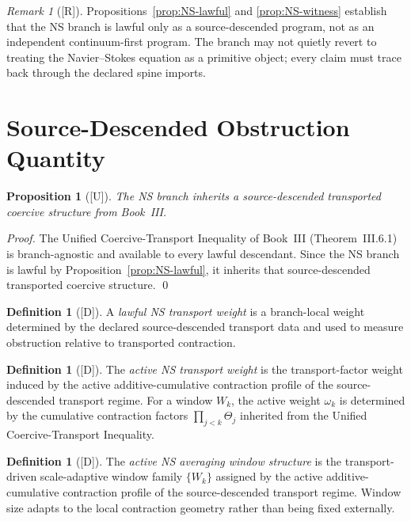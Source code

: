 \documentclass[12pt,oneside]{amsbook}
\theoremstyle{plain}
\newtheorem{proposition}[theorem]{Proposition}
\theoremstyle{definition}
\newtheorem{definition}[theorem]{Definition}
\theoremstyle{remark}
\newtheorem{remark}[theorem]{Remark}
\newcommand{\status}[1]{\textup{[#1]}}
\begin{document}
\begin{remark}[\status{R}]\label{rmk:NS-source-descended}
Propositions~\ref{prop:NS-lawful} and \ref{prop:NS-witness}
establish that the NS branch is lawful only as a
source-descended program, not as an independent
continuum-first program. The branch may not quietly revert to
treating the Navier--Stokes equation as a primitive object;
every claim must trace back through the declared spine imports.
\end{remark}

\section{Source-Descended Obstruction Quantity}
\label{sec:obstruction}

\begin{proposition}[\status{U}]\label{prop:NS-inherits}
The NS branch inherits a source-descended transported coercive
structure from Book~III.
\end{proposition}

\begin{proof}
The Unified Coercive-Transport Inequality of Book~III
(Theorem~III.6.1) is branch-agnostic and available to every
lawful descendant. Since the NS branch is lawful by
Proposition~\ref{prop:NS-lawful}, it inherits that
source-descended transported coercive structure.
\qed
\end{proof}

\begin{definition}[\status{D}]\label{def:NS-transport-weight}
A \emph{lawful NS transport weight} is a branch-local weight
determined by the declared source-descended transport data and
used to measure obstruction relative to transported contraction.
\end{definition}

\begin{definition}[\status{D}]\label{def:NS-active-weight}
The \emph{active NS transport weight} is the transport-factor
weight induced by the active additive-cumulative contraction
profile of the source-descended transport regime. For a window
$W_k$, the active weight $\omega_k$ is determined by the
cumulative contraction factors $\prod_{j < k} \Theta_j$ inherited
from the Unified Coercive-Transport Inequality.
\end{definition}

\begin{definition}[\status{D}]\label{def:NS-window}
The \emph{active NS averaging window structure} is the
transport-driven scale-adaptive window family $\{W_k\}$ assigned
by the active additive-cumulative contraction profile of the
source-descended transport regime. Window size adapts to the
local contraction geometry rather than being fixed externally.
\end{definition}
\end{document}
